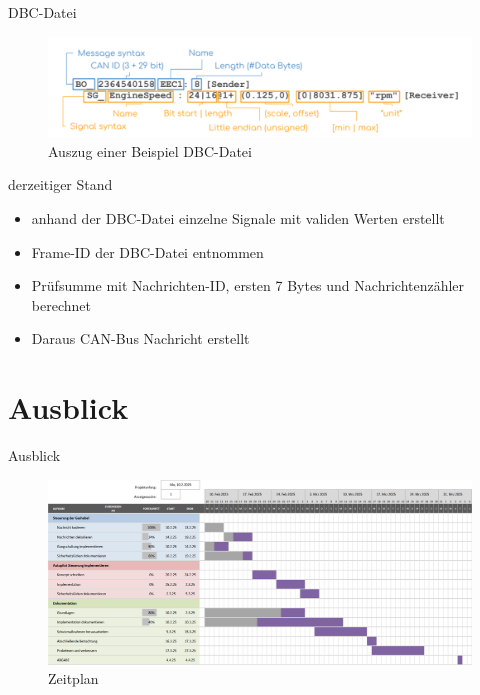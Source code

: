 \documentclass[usenames, dvipsnames, aspectratio=75]{beamer}
\begin{document}
\begin{frame}{DBC-Datei}
    \begin{figure}
        \centering
        \includegraphics[width=1\linewidth]{assets/CAN-DBC-File-Format-Explained-Intro-Basics_2.png}
        \caption{Auszug einer Beispiel DBC-Datei}
    \end{figure}
\end{frame}

\begin{frame}{derzeitiger Stand}
    \begin{itemize}
        \item anhand der DBC-Datei einzelne Signale mit validen Werten erstellt
        \item Frame-ID der DBC-Datei entnommen
        \item Prüfsumme mit Nachrichten-ID, ersten 7 Bytes und Nachrichtenzähler berechnet
        \item Daraus CAN-Bus Nachricht erstellt
    \end{itemize}
    
\end{frame}


\section{Ausblick}
\begin{frame}{Ausblick}
    \begin{figure}
        \centering
        \includegraphics[width=1\linewidth]{assets/Zeitplan.png}
        \caption{Zeitplan}
    \end{figure}
\end{frame}

\end{document}
